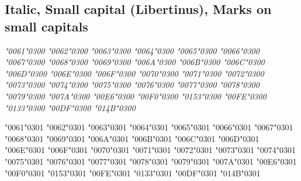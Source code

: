 \newpage
\subsection*{Italic, Small capital (Libertinus), Marks on small capitals}

{\itshape
\textsc{\char"0061\char"0300} \textsc{\char"0062\char"0300} \textsc{\char"0063\char"0300} \textsc{\char"0064\char"0300} \textsc{\char"0065\char"0300} \textsc{\char"0066\char"0300} \textsc{\char"0067\char"0300} \textsc{\char"0068\char"0300} \textsc{\char"0069\char"0300} \textsc{\char"006A\char"0300} \textsc{\char"006B\char"0300} \textsc{\char"006C\char"0300} \textsc{\char"006D\char"0300} \textsc{\char"006E\char"0300} \textsc{\char"006F\char"0300} \textsc{\char"0070\char"0300} \textsc{\char"0071\char"0300} \textsc{\char"0072\char"0300} \textsc{\char"0073\char"0300} \textsc{\char"0074\char"0300} \textsc{\char"0075\char"0300} \textsc{\char"0076\char"0300} \textsc{\char"0077\char"0300} \textsc{\char"0078\char"0300} \textsc{\char"0079\char"0300} \textsc{\char"007A\char"0300} \textsc{\char"00E6\char"0300} \textsc{\char"00F0\char"0300} \textsc{\char"0153\char"0300} \textsc{\char"00FE\char"0300} \textsc{\char"0133\char"0300} \textsc{\char"00DF\char"0300} \textsc{\char"014B\char"0300}

\textsc{\char"0061\char"0301} \textsc{\char"0062\char"0301} \textsc{\char"0063\char"0301} \textsc{\char"0064\char"0301} \textsc{\char"0065\char"0301} \textsc{\char"0066\char"0301} \textsc{\char"0067\char"0301} \textsc{\char"0068\char"0301} \textsc{\char"0069\char"0301} \textsc{\char"006A\char"0301} \textsc{\char"006B\char"0301} \textsc{\char"006C\char"0301} \textsc{\char"006D\char"0301} \textsc{\char"006E\char"0301} \textsc{\char"006F\char"0301} \textsc{\char"0070\char"0301} \textsc{\char"0071\char"0301} \textsc{\char"0072\char"0301} \textsc{\char"0073\char"0301} \textsc{\char"0074\char"0301} \textsc{\char"0075\char"0301} \textsc{\char"0076\char"0301} \textsc{\char"0077\char"0301} \textsc{\char"0078\char"0301} \textsc{\char"0079\char"0301} \textsc{\char"007A\char"0301} \textsc{\char"00E6\char"0301} \textsc{\char"00F0\char"0301} \textsc{\char"0153\char"0301} \textsc{\char"00FE\char"0301} \textsc{\char"0133\char"0301} \textsc{\char"00DF\char"0301} \textsc{\char"014B\char"0301}

}
